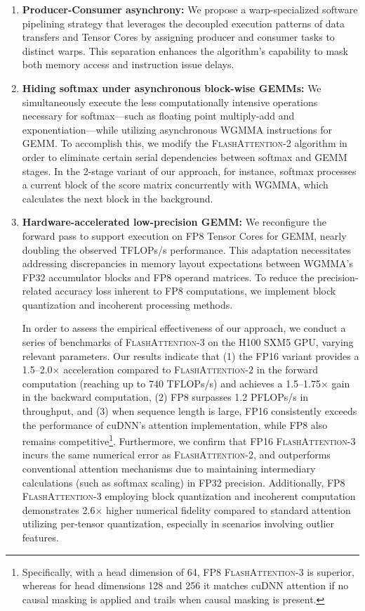\begin{enumerate}

\item \textbf{Producer-Consumer asynchrony:} We propose a warp-specialized software pipelining strategy that leverages the decoupled execution patterns of data transfers and Tensor Cores by assigning producer and consumer tasks to distinct warps. This separation enhances the algorithm’s capability to mask both memory access and instruction issue delays.
\item \textbf{Hiding softmax under asynchronous block-wise GEMMs:} We simultaneously execute the less computationally intensive operations necessary for softmax—such as floating point multiply-add and exponentiation—while utilizing asynchronous WGMMA instructions for GEMM. To accomplish this, we modify the \textsc{FlashAttention-2} algorithm in order to eliminate certain serial dependencies between softmax and GEMM stages. In the 2-stage variant of our approach, for instance, softmax processes a current block of the score matrix concurrently with WGMMA, which calculates the next block in the background.
\item \textbf{Hardware-accelerated low-precision GEMM:} We reconfigure the forward pass to support execution on FP8 Tensor Cores for GEMM, nearly doubling the observed TFLOPs/s performance. This adaptation necessitates addressing discrepancies in memory layout expectations between WGMMA’s FP32 accumulator blocks and FP8 operand matrices. To reduce the precision-related accuracy loss inherent to FP8 computations, we implement block quantization and incoherent processing methods.

In order to assess the empirical effectiveness of our approach, we conduct a series of benchmarks of \textsc{FlashAttention-3} on the H100 SXM5 GPU, varying relevant parameters. Our results indicate that (1) the FP16 variant provides a 1.5–2.0$\times$ acceleration compared to \textsc{FlashAttention-2} in the forward computation (reaching up to 740 TFLOPs/s) and achieves a 1.5–1.75$\times$ gain in the backward computation, (2) FP8 surpasses 1.2 PFLOPs/s in throughput, and (3) when sequence length is large, FP16 consistently exceeds the performance of cuDNN's attention implementation, while FP8 also remains competitive\footnote{Specifically, with a head dimension of 64, FP8 \textsc{FlashAttention-3} is superior, whereas for head dimensions 128 and 256 it matches cuDNN attention if no causal masking is applied and trails when causal masking is present.}. Furthermore, we confirm that FP16 \textsc{FlashAttention-3} incurs the same numerical error as \textsc{FlashAttention-2}, and outperforms conventional attention mechanisms due to maintaining intermediary calculations (such as softmax scaling) in FP32 precision. Additionally, FP8 \textsc{FlashAttention-3} employing block quantization and incoherent computation demonstrates 2.6$\times$ higher numerical fidelity compared to standard attention utilizing per-tensor quantization, especially in scenarios involving outlier features.


\end{enumerate}
